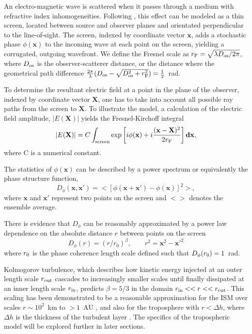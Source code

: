 An electro-magnetic wave is scattered when it passes through a medium with refractive index inhomogeneities. Following \citet{Narayan_1992}, this effect can be modeled as a thin screen, located between source and observer planes and orientated perpendicular to the line-of-sight. The screen, indexed by coordinate vector $\mathbf{x}$, adds a stochastic phase $\phi(\mathbf{x})$ to the incoming wave at each point on the screen, yielding a corrugated, outgoing wavefront. We define the Fresnel scale as  $r_{\rm F} = \sqrt{\lambda D_{\rm os}/2\pi}$, where $D_{\rm os}$ is the observer-scatterer distance, or the distance where the geometrical path difference $\frac{2\pi}{\lambda} (D_{\rm os} - \sqrt{D_{\rm os}^2 + r_{\rm F}^2}) =\frac{1}{2}$~rad.


To determine the resultant electric field at a point in the plane of the observer, indexed by coordinate vector $\mathbf{X}$, one has to take into account all possible ray paths from the screen to $\mathbf{X}$. To illustrate the model, a calculation of the electric field amplitude, $|E(\mathbf{X})|$ yields the Fresnel-Kirchoff integral \citep*{BORN_1980}
\begin{equation}\label{Fresnel- Kirchoff}
|E(\mathbf{X})| = C \int_{\rm screen} \exp\left[i\phi(\mathbf{x}) + i \frac{(\mathbf{x}-\mathbf{X})^2}{2 r_{\rm F}}\right]\mathbf{dx},
\end{equation}
where C is a numerical constant.


The statistics of $\phi(\mathbf{x})$ can be described by a power spectrum or equivalently the phase structure function,
\begin{equation}\label{eq:D_phi}
D_\phi (\mathbf{x},\mathbf{x'}) = < \left[ \phi(\mathbf{x} +\mathbf{x'}) - \phi(\mathbf{x})\right]^2 >,
\end{equation}
where $\mathbf{x}$ and $\mathbf{x'} $ represent two points on the screen and $<>$ denotes the ensemble average. 

There is evidence that $D_\phi$ can be reasonably approximated by a power law dependence on the absolute distance $r$ between points on the screen  \citep{Armstrong_1995,carilli_1997}
\begin{equation}
D_\phi (r) =  (r/r_0)^\beta,\qquad r^2 = \mathbf{x}^2 - \mathbf{x'}^2
\label{kolmogorov}
\end{equation}
where $r_{\rm 0}$ is the phase coherence length scale defined such that $D_\phi(r_{\rm 0}) = 1$~rad. 

Kolmogorov turbulence, which describes how kinetic energy injected at an outer length scale $r_{\rm out}$ cascades to increasingly smaller scales until finally dissipated at an inner length scale $r_{\rm in}$, predicts $\beta = 5/3$ in the domain ${r_{\rm in}<<r<<r_{\rm out}}$. This scaling has been demonstrated to be a reasonable approximation for the ISM over scales $r \sim 10^2$~km to $>1$~AU \citep*{Johnson_2015a}, and also for the troposphere with $r< \Delta h$, where $\Delta h$ is the thickness of the turbulent layer \cite{Coulman_1985}. The specifics of the tropospheric model will be explored further in later sections.


